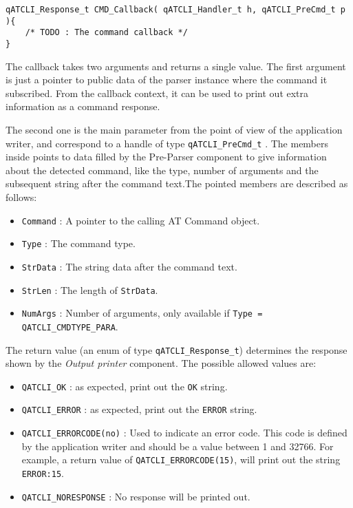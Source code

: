 \begin{lstlisting}[style=CStyle]
qATCLI_Response_t CMD_Callback( qATCLI_Handler_t h, qATCLI_PreCmd_t p ){
    /* TODO : The command callback */
}
\end{lstlisting}

The callback takes two arguments and returns a single value. The first argument is just a pointer to public data of the parser instance where the command it subscribed. From the callback context, it can be used to print out extra information as a command response.
\medskip

The second one is the main parameter from the point of view of the application writer, and correspond to a handle of type \lstinline{qATCLI_PreCmd_t} . The members inside points to data filled by the Pre-Parser component to give information about the detected command, like the type, number of arguments and the subsequent string after the command text.The pointed members are described as follows:

\begin{itemize}
    \item \lstinline{Command} : A pointer to the calling AT Command object.
    \item \lstinline{Type} : The command type.
    \item \lstinline{StrData} : The string data after the command text.
    \item \lstinline{StrLen} : The length of \lstinline{StrData}.
    \item \lstinline{NumArgs} : Number of arguments, only available if \lstinline{Type = QATCLI_CMDTYPE_PARA}.
\end{itemize}

The return value (an enum of type \lstinline{qATCLI_Response_t})  determines the response shown by the \textit{Output printer} component. The possible allowed values are:

\begin{itemize}
    \item \lstinline{QATCLI_OK} : as expected, print out the \lstinline{OK} string.
    \item \lstinline{QATCLI_ERROR} : as expected, print out the \lstinline{ERROR} string.
    \item \lstinline{QATCLI_ERRORCODE(no)} : Used to indicate an error code. This code is defined by the application writer and should be a value between 1 and 32766. For example, a return value of \lstinline{QATCLI_ERRORCODE(15)}, will print out the string \lstinline{ERROR:15}.
    \item \lstinline{QATCLI_NORESPONSE} : No response will be printed out.
\end{itemize}


